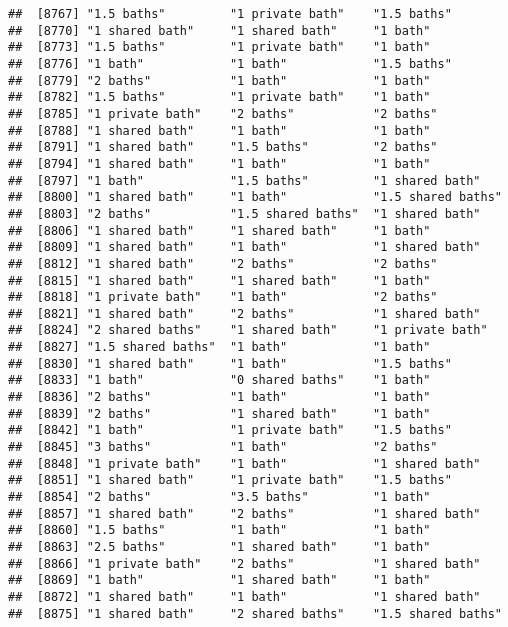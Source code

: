 \documentclass[
]{article}
\begin{document}
\begin{verbatim}
##  [8767] "1.5 baths"         "1 private bath"    "1.5 baths"        
##  [8770] "1 shared bath"     "1 shared bath"     "1 bath"           
##  [8773] "1.5 baths"         "1 private bath"    "1 bath"           
##  [8776] "1 bath"            "1 bath"            "1.5 baths"        
##  [8779] "2 baths"           "1 bath"            "1 bath"           
##  [8782] "1.5 baths"         "1 private bath"    "1 bath"           
##  [8785] "1 private bath"    "2 baths"           "2 baths"          
##  [8788] "1 shared bath"     "1 bath"            "1 bath"           
##  [8791] "1 shared bath"     "1.5 baths"         "2 baths"          
##  [8794] "1 shared bath"     "1 bath"            "1 bath"           
##  [8797] "1 bath"            "1.5 baths"         "1 shared bath"    
##  [8800] "1 shared bath"     "1 bath"            "1.5 shared baths" 
##  [8803] "2 baths"           "1.5 shared baths"  "1 shared bath"    
##  [8806] "1 shared bath"     "1 shared bath"     "1 bath"           
##  [8809] "1 shared bath"     "1 bath"            "1 shared bath"    
##  [8812] "1 shared bath"     "2 baths"           "2 baths"          
##  [8815] "1 shared bath"     "1 shared bath"     "1 bath"           
##  [8818] "1 private bath"    "1 bath"            "2 baths"          
##  [8821] "1 shared bath"     "2 baths"           "1 shared bath"    
##  [8824] "2 shared baths"    "1 shared bath"     "1 private bath"   
##  [8827] "1.5 shared baths"  "1 bath"            "1 bath"           
##  [8830] "1 shared bath"     "1 bath"            "1.5 baths"        
##  [8833] "1 bath"            "0 shared baths"    "1 bath"           
##  [8836] "2 baths"           "1 bath"            "1 bath"           
##  [8839] "2 baths"           "1 shared bath"     "1 bath"           
##  [8842] "1 bath"            "1 private bath"    "1.5 baths"        
##  [8845] "3 baths"           "1 bath"            "2 baths"          
##  [8848] "1 private bath"    "1 bath"            "1 shared bath"    
##  [8851] "1 shared bath"     "1 private bath"    "1.5 baths"        
##  [8854] "2 baths"           "3.5 baths"         "1 bath"           
##  [8857] "1 shared bath"     "2 baths"           "1 shared bath"    
##  [8860] "1.5 baths"         "1 bath"            "1 bath"           
##  [8863] "2.5 baths"         "1 shared bath"     "1 bath"           
##  [8866] "1 private bath"    "2 baths"           "1 shared bath"    
##  [8869] "1 bath"            "1 shared bath"     "1 bath"           
##  [8872] "1 shared bath"     "1 bath"            "1 shared bath"    
##  [8875] "1 shared bath"     "2 shared baths"    "1.5 shared baths" 

\end{verbatim}
\end{document}

